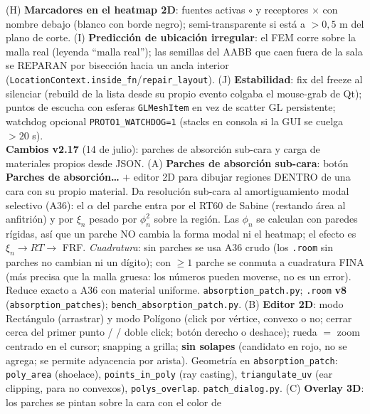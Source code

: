 \documentclass[11pt, a4paper]{article}
\newcommand{\tecla}[1]{\texttt{\small\fbox{#1}}}
\newcommand{\menu}[1]{\textbf{\guillemotleft #1\guillemotright}}
\begin{document}
\begin{center}
{    (H) \textbf{Marcadores en el heatmap 2D}: fuentes activas $\circ$ y
    receptores $\times$ con nombre debajo (blanco con borde negro);
    semi-transparente si está a $>0{,}5$ m del plano de corte.
    (I) \textbf{Predicción de ubicación irregular}: el FEM corre sobre la
    malla real (leyenda ``malla real''); las semillas del AABB que caen fuera
    de la sala se REPARAN por bisección hacia un ancla interior
    (\texttt{LocationContext.inside\_fn}/\texttt{repair\_layout}).
    (J) \textbf{Estabilidad}: fix del freeze al silenciar (rebuild de la lista
    desde su propio evento colgaba el mouse-grab de Qt); puntos de escucha con
    esferas \texttt{GLMeshItem} en vez de scatter GL persistente; watchdog
    opcional \texttt{PROTO1\_WATCHDOG=1} (stacks en consola si la GUI se
    cuelga $>20$ s).\\[2pt]
    \textbf{Cambios v2.17} (14 de julio): parches de absorción sub-cara y carga
    de materiales propios desde JSON.
    (A) \textbf{Parches de absorción sub-cara}: botón
    \menu{Parches de absorción\ldots} $+$ editor 2D para dibujar regiones
    DENTRO de una cara con su propio material. Da resolución sub-cara al
    amortiguamiento modal selectivo (A36): el $\alpha$ del parche entra por el
    RT60 de Sabine (restando área al anfitrión) y por $\xi_n$ pesado por
    $\phi_n^2$ sobre la región. Las $\phi_n$ se calculan con paredes rígidas, así
    que un parche NO cambia la forma modal ni el heatmap; el efecto es
    $\xi_n \to RT \to$ FRF. \emph{Cuadratura}: sin parches se usa A36 crudo (los
    \texttt{.room} sin parches no cambian ni un dígito); con $\geq 1$ parche se
    conmuta a cuadratura FINA (más precisa que la malla gruesa: los números
    pueden moverse, no es un error). Reduce exacto a A36 con material uniforme.
    \texttt{absorption\_patch.py}; \texttt{.room} \textbf{v8}
    (\texttt{absorption\_patches}); \texttt{bench\_absorption\_patch.py}.
    (B) \textbf{Editor 2D}: modo Rectángulo (arrastrar) y modo Polígono (click
    por vértice, convexo o no; cerrar cerca del primer punto / \tecla{Enter} /
    doble click; botón derecho o \tecla{Esc} deshace); rueda $=$ zoom centrado en
    el cursor; snapping a grilla; \textbf{sin solapes} (candidato en rojo, no se
    agrega; se permite adyacencia por arista). Geometría en
    \texttt{absorption\_patch}: \texttt{poly\_area} (shoelace),
    \texttt{points\_in\_poly} (ray casting), \texttt{triangulate\_uv} (ear
    clipping, para no convexos), \texttt{polys\_overlap}.
    \texttt{patch\_dialog.py}.
    (C) \textbf{Overlay 3D}: los parches se pintan sobre la cara con el color de
}
\end{center}
\end{document}
